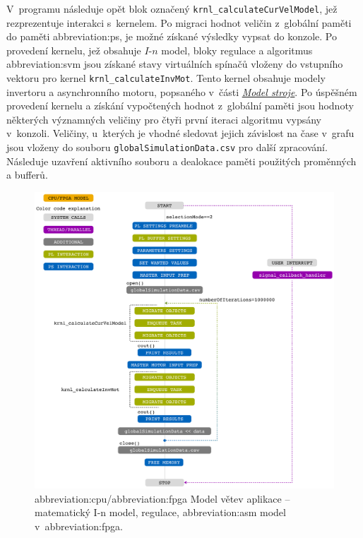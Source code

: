 \documentclass[a4paper, twoside, 11pt]{article}
\begin{document}
			V~programu následuje opět blok označený \texttt{krnl\_calculateCurVelModel}, jež rezprezentuje interakci s~kernelem. Po migraci hodnot veličin z~globální paměti do paměti \gls{abbreviation:ps}, je možné získané výsledky vypsat do konzole. Po provedení kernelu, jež obsahuje $I$-$n$ model, bloky regulace a algoritmus \gls{abbreviation:svm} jsou získané stavy virtuálních spínačů vloženy do vstupního vektoru pro kernel \texttt{krnl\_calculateInvMot}. Tento kernel obsahuje modely invertoru a asynchronního motoru, popsaného v~části \hyperref[sec:model-stroje]{\textit{Model stroje}}. Po úspěšném provedení kernelu a získání vypočtených hodnot z~globální paměti jsou hodnoty některých významných veličiny pro čtyři první iteraci algoritmu vypsány v~konzoli. Veličiny, u~kterých je vhodné sledovat jejich závislost na čase v~grafu jsou vloženy do souboru  \texttt{globalSimulationData.csv} pro další zpracování. Následuje uzavření aktivního souboru a dealokace paměti použitých proměnných a bufferů.

			\begin{figure}[htbp!]
				\centering
				\includegraphics[width=1\textwidth]{src/pdf/cpu-fpga-model.pdf}
				\caption{\gls{abbreviation:cpu}/\gls{abbreviation:fpga} Model větev aplikace – matematický I-n model, regulace, \gls{abbreviation:asm} model v~\gls{abbreviation:fpga}.}
				\label{fig:cpu-fpga-model}
			\end{figure}	 
\end{document}

